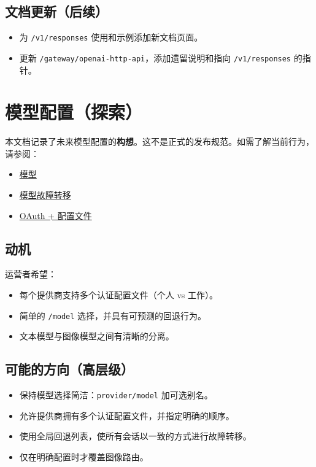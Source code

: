 \subsection{文档更新（后续）}


\begin{itemize}
  \item 为 \texttt{/v1/responses} 使用和示例添加新文档页面。
  \item 更新 \texttt{/gateway/openai-http-api}，添加遗留说明和指向 \texttt{/v1/responses} 的指针。
\end{itemize}



\clearpage

\section{模型配置（探索）}


本文档记录了未来模型配置的\textbf{构想}。这不是正式的发布规范。如需了解当前行为，请参阅：

\begin{itemize}
  \item \href{/concepts/models}{模型}
  \item \href{/concepts/model-failover}{模型故障转移}
  \item \href{/concepts/oauth}{OAuth + 配置文件}
\end{itemize}


\subsection{动机}


运营者希望：

\begin{itemize}
  \item 每个提供商支持多个认证配置文件（个人 vs 工作）。
  \item 简单的 \texttt{/model} 选择，并具有可预测的回退行为。
  \item 文本模型与图像模型之间有清晰的分离。
\end{itemize}


\subsection{可能的方向（高层级）}


\begin{itemize}
  \item 保持模型选择简洁：\texttt{provider/model} 加可选别名。
  \item 允许提供商拥有多个认证配置文件，并指定明确的顺序。
  \item 使用全局回退列表，使所有会话以一致的方式进行故障转移。
  \item 仅在明确配置时才覆盖图像路由。
\end{itemize}


